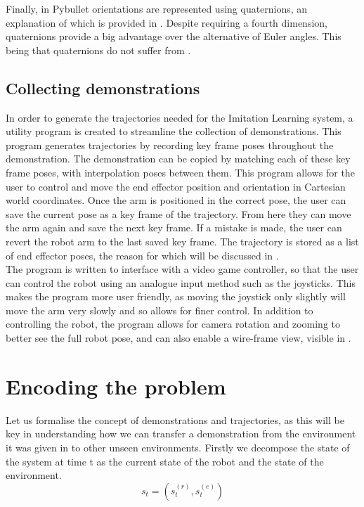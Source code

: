 Finally, in Pybullet orientations are represented using quaternions, \cite{quaternions, orientations} an explanation of which is provided in . Despite requiring a fourth dimension, quaternions provide a big advantage over the alternative of Euler angles. This being that quaternions do not suffer from  \cite{gimbal, gimbal-lock}.

\subsection{Collecting demonstrations}
In order to generate the trajectories needed for the Imitation Learning system, a utility program is created to streamline the collection of demonstrations. This program generates trajectories by recording key frame poses throughout the demonstration. The demonstration can be copied by matching each of these key frame poses, with interpolation poses between them. This program allows for the user to control and move the end effector position and orientation in Cartesian world coordinates. Once the arm is positioned in the correct pose, the user can save the current pose as a key frame of the trajectory. From here they can move the arm again and save the next key frame. If a mistake is made, the user can revert the robot arm to the last saved key frame. The trajectory is stored as a list of end effector poses, the reason for which will be discussed in .\\

The program is written to interface with a video game controller, so that the user can control the robot using an analogue input method such as the joysticks. This makes the program more user friendly, as moving the joystick only slightly will move the arm very slowly and so allows for finer control. In addition to controlling the robot, the program allows for camera rotation and zooming to better see the full robot pose, and can also enable a wire-frame view, visible in .


\section{Encoding the problem}
\label{sec:trajectories}
Let us formalise the concept of demonstrations and trajectories, as this will be key in understanding how we can transfer a demonstration from the environment it was given in to other unseen environments. Firstly we decompose the state of the system at time t as the current state of the robot and the state of the environment.
$$s_t = (s^{(r)}_t, s^{(e)}_t)$$

